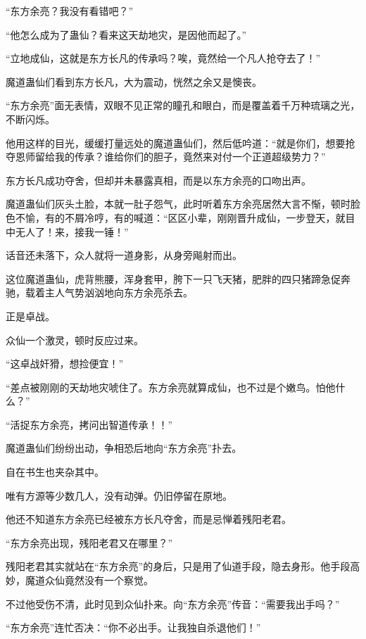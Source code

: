 
\begin{this_body}



“东方余亮？我没有看错吧？”

“他怎么成为了蛊仙？看来这天劫地灾，是因他而起了。”

“立地成仙，这就是东方长凡的传承吗？唉，竟然给一个凡人抢夺去了！”

魔道蛊仙们看到东方长凡，大为震动，恍然之余又是懊丧。

“东方余亮”面无表情，双眼不见正常的瞳孔和眼白，而是覆盖着千万种琉璃之光，不断闪烁。

他用这样的目光，缓缓打量远处的魔道蛊仙们，然后低吟道：“就是你们，想要抢夺恩师留给我的传承？谁给你们的胆子，竟然来对付一个正道超级势力？”

东方长凡成功夺舍，但却并未暴露真相，而是以东方余亮的口吻出声。

魔道蛊仙们灰头土脸，本就一肚子怨气，此时听着东方余亮居然大言不惭，顿时脸色不愉，有的不屑冷哼，有的喊道：“区区小辈，刚刚晋升成仙，一步登天，就目中无人了！来，接我一锤！”

话音还未落下，众人就将一道身影，从身旁飚射而出。

这位魔道蛊仙，虎背熊腰，浑身套甲，胯下一只飞天猪，肥胖的四只猪蹄急促奔驰，载着主人气势汹汹地向东方余亮杀去。

正是卓战。

众仙一个激灵，顿时反应过来。

“这卓战奸猾，想捡便宜！”

“差点被刚刚的天劫地灾唬住了。东方余亮就算成仙，也不过是个嫩鸟。怕他什么？”

“活捉东方余亮，拷问出智道传承！！”

魔道蛊仙们纷纷出动，争相恐后地向“东方余亮”扑去。

自在书生也夹杂其中。

唯有方源等少数几人，没有动弹。仍旧停留在原地。

他还不知道东方余亮已经被东方长凡夺舍，而是忌惮着残阳老君。

“东方余亮出现，残阳老君又在哪里？”

残阳老君其实就站在“东方余亮”的身后，只是用了仙道手段，隐去身形。他手段高妙，魔道众仙竟然没有一个察觉。

不过他受伤不清，此时见到众仙扑来。向“东方余亮”传音：“需要我出手吗？”

“东方余亮”连忙否决：“你不必出手。让我独自杀退他们！”


\end{this_body}
